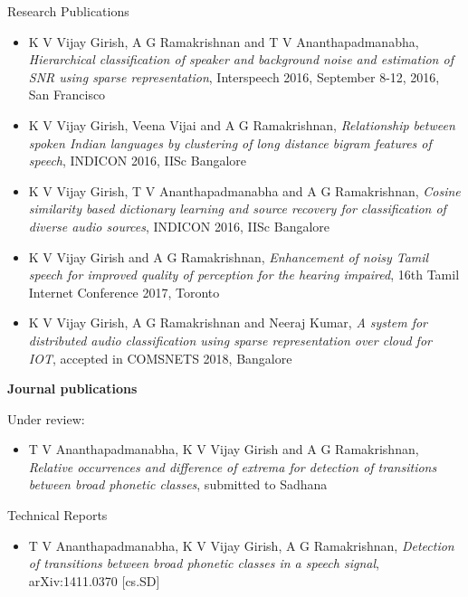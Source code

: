 \documentclass[10pt]{article}
\begin{document}
\begin{cv}
\begin{cvlist}{Research Publications}
\begin{itemize}
\item	K V Vijay Girish, A G Ramakrishnan and T V Ananthapadmanabha, \textit{Hierarchical classification of speaker and background noise and estimation of SNR using sparse representation}, Interspeech 2016, September 8-12, 2016, San Francisco

\item  K V Vijay Girish, Veena Vijai and A G Ramakrishnan,  \textit{Relationship between spoken Indian languages by clustering of long distance bigram features of speech},  INDICON 2016, IISc Bangalore

\item  K V Vijay Girish, T V Ananthapadmanabha and A G Ramakrishnan,  \textit{Cosine similarity based dictionary learning and source recovery for classification of diverse audio sources}, INDICON 2016, IISc Bangalore
\item K V Vijay Girish and A G Ramakrishnan, \textit{Enhancement of noisy Tamil speech for improved quality of perception for the hearing impaired}, 16th Tamil Internet Conference 2017, Toronto
\item K V Vijay Girish, A G Ramakrishnan and Neeraj Kumar, \textit{A system for distributed audio classification using sparse representation over cloud for IOT}, accepted in COMSNETS 2018, Bangalore
	\end{itemize}

\item \textbf{Journal publications}
\item Under review: 
\begin{itemize}
\item T V Ananthapadmanabha, K V Vijay Girish and A G Ramakrishnan,  \textit{Relative occurrences and difference of extrema for detection of transitions between broad phonetic classes}, submitted to Sadhana

	\end{itemize}
	


\end{cvlist}

\begin{cvlist}{Technical Reports}
\item
\begin{itemize}
\item T V Ananthapadmanabha, K V Vijay Girish, A G Ramakrishnan, \textit{Detection of transitions between broad phonetic classes in a speech signal}, 	arXiv:1411.0370 [cs.SD]


\end{itemize}
\end{cvlist}
\end{cv}
\end{document}
